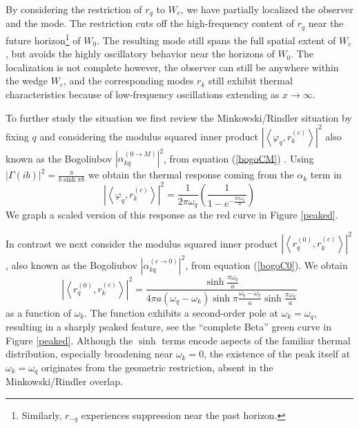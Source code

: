\documentclass[12pt,a4paper]{article}
\begin{document}
{By considering the restriction of $r_q$ to $W_c$, we have partially localized the observer and the mode. The restriction cuts off the high-frequency content of $r_q$ near the future horizon\footnote{Similarly, $r_{-q}$ experiences suppression near the past horizon.} of $W_0$. The resulting mode still spans the full spatial extent of $W_c$, but avoids the highly oscillatory behavior near the horizons of $W_0$.  The localization is not complete however, the observer can still be anywhere within the wedge $W_c$, and the corresponding modes $r_k$ still exhibit thermal characteristics because of low-frequency oscillations extending as $x \rightarrow \infty$.

To further study the situation we first review the Minkowski/Rindler situation by fixing $q$ and considering the modulus squared inner product $\left|\left<\varphi_q, r_k^{(c)} \right>\right|^2$ also known as the Bogoliubov $\left|\alpha^{(0 \rightarrow M)}_{kq}\right|^2$, from equation (\ref{bogoCM}) . Using $|\Gamma(ib)|^2 = \frac{\pi}{b \sinh \pi b}$ we obtain the thermal response coming from the $\alpha_k$ term in
\begin{equation}
  \left|\left<\varphi_q, r_k^{(c)} \right>\right|^2 = \frac{1}{2\pi\omega_q} \left(\frac{1}{1 - e^{-\frac{2 \pi \omega_k}{a}}}\right)
\end{equation}
We graph a scaled version of this response as the red curve in Figure \ref{peaked}.

In contrast we next consider the modulus squared inner product $\left|\left<r_q^{(0)}, r_k^{(c)} \right>\right|^2$, also known as the Bogoliubov $\left|\alpha^{(c \rightarrow 0)}_{kq}\right|^2$, from equation (\ref{bogoC0}). We obtain
\begin{equation}
  \left|\left<r_q^{(0)}, r_k^{(c)} \right>\right|^2 = \frac{\sinh \frac{\pi \omega_q}{a}}{4\pi a (\omega_q - \omega_k) \sinh \pi \frac{\omega_q - \omega_k}{a} \sinh \frac{\pi \omega_k}{a}}
\end{equation}
as a function of $\omega_k$. The function exhibits a second-order pole at $\omega_k = \omega_q$, resulting in a sharply peaked feature, see the ``complete Beta'' green curve in Figure \ref{peaked}. Although the $\sinh$ terms encode aspects of the familiar thermal distribution, especially broadening near $\omega_k = 0$, the existence of the peak itself at $\omega_k = \omega_q$ originates from the geometric restriction, absent in the Minkowski/Rindler overlap.

}
\end{document}
